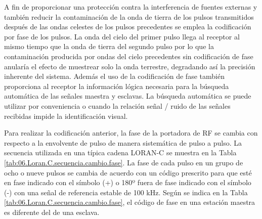 A fin de proporcionar una protección contra la interferencia de fuentes externas y también reducir la contaminación de la onda de tierra de los pulsos transmitidos después de las ondas celestes de los pulsos precedentes se emplea la codificaci\'on por fase de los pulsos. La onda del cielo del primer pulso llega al receptor al mismo tiempo que la onda de tierra del segundo pulso por lo que la contaminación producida por ondas del cielo precedentes sin codificación de fase anularía el efecto de muestrear solo la onda terrestre, degradando así la precisión inherente del sistema.
Además el uso de la codificación de fase también proporciona al receptor la información lógica necesaria para la búsqueda automática de las señales maestra y esclavas. La búsqueda automática se puede utilizar por conveniencia o cuando la relación señal / ruido de las señales recibidas impide la identificación visual.

 



Para realizar la codificaci\'on anterior,  la fase de la portadora de RF se cambia con respecto a la envolvente de pulso de manera sistemática de pulso a pulso. 
La secuencia utilizada en una típica cadena LORAN-C se muestra en la Tabla \ref{tab:06.Loran.C.secuencia.cambio.fase}.
La fase de cada pulso en un grupo de ocho o nueve pulsos se cambia de acuerdo con un código prescrito para que esté en fase indicado con el s\'imbolo (+) o 180º fuera de fase indicado con el s\'imbolo (-) con una señal de referencia estable de 100 kHz. Seg\'un se indica en la Tabla \ref{tab:06.Loran.C.secuencia.cambio.fase}, el código de fase en una estación maestra es diferente del de una esclava.




